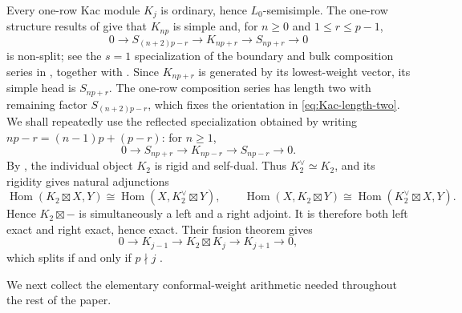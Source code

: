 \documentclass[12pt,leqno]{amsart}
\numberwithin{equation}{section}
\newcommand{\Hom}{\operatorname{Hom}}
\begin{document}
Every one-row Kac module $K_j$ is ordinary, hence $L_0$-semisimple.
The one-row structure results of \cite{McRaeSopin} give that $K_{np}$ is
simple and, for $n\geq0$ and $1\leq r\leq p-1$,
\begin{equation}\label{eq:Kac-length-two}
 0\longrightarrow S_{(n+2)p-r}\longrightarrow K_{np+r}
 \longrightarrow S_{np+r}\longrightarrow0
\end{equation}
is non-split; see the $s=1$ specialization of the boundary and bulk
composition series in \cite[Section~2.3]{McRaeSopin}, together with
\cite[Remark~2.2]{McRaeSopin}.  Since $K_{np+r}$ is generated by its
lowest-weight vector, its simple head is $S_{np+r}$.  The one-row
composition series has length two with remaining factor
$S_{(n+2)p-r}$, which fixes the orientation in
\eqref{eq:Kac-length-two}.  We shall repeatedly use the reflected
specialization obtained by writing
$np-r=(n-1)p+(p-r)$: for $n\ge1$,
\begin{equation}\label{eq:Kac-reflected-length-two}
 0\longrightarrow S_{np+r}\longrightarrow K_{np-r}
 \longrightarrow S_{np-r}\longrightarrow0.
\end{equation}
By \cite[Theorem~5.10]{McRaeSopin}, the individual object $K_2$ is rigid
and self-dual.  Thus $K_2^\vee\simeq K_2$, and its rigidity gives natural
adjunctions
\[
 \Hom(K_2\boxtimes X,Y)\cong\Hom(X,K_2^\vee\boxtimes Y),
 \qquad
 \Hom(X,K_2\boxtimes Y)\cong\Hom(K_2^\vee\boxtimes X,Y).
\]
Hence $K_2\boxtimes-$ is simultaneously a left and a right adjoint.  It is
therefore both left exact and right exact, hence exact.  Their fusion theorem gives
\begin{equation}\label{eq:K2-fusion}
 0\longrightarrow K_{j-1}\longrightarrow K_2\boxtimes K_j
 \longrightarrow K_{j+1}\longrightarrow0,
\end{equation}
which splits if and only if $p\nmid j$
\cite[Theorem~6.5]{McRaeSopin}.

We next collect the elementary conformal-weight arithmetic needed
throughout the rest of the paper.
\end{document}
